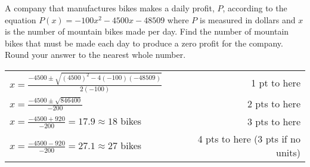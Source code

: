 {
	A company that manufactures bikes makes a daily profit, $P$, according to the equation $\displaystyle P(x)=-100x^2-4500x-48509$ where $P$ is measured in dollars and $x$ is the number of  mountain bikes made per day. Find the number of mountain bikes that must be made each day to produce a zero profit for the company. Round your answer to the nearest whole number.
}
{
	\begin{tabular}{l r}
	$x=\frac{-4500 \pm \sqrt{(4500)^2-4(-100)(-48509)}}{2(-100)}$ & 1 pt to here\\
	$x=\frac{-4500 \pm \sqrt{846400}}{-200}$ &  2 pts to here\\
	$x=\frac{-4500+920}{-200}=17.9 \approx 18$ bikes & 3 pts to here\\
	$x=\frac{-4500-920}{-200}=27.1 \approx 27$ bikes & 4 pts to here (3 pts if no units)
	\end{tabular}
}

